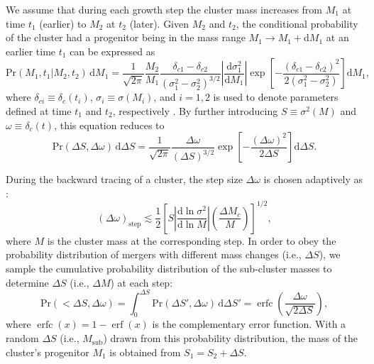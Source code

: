 \documentclass[modern]{aastex62}
\newcommand{\R}[1]{\mathrm{#1}}
\newcommand{\D}[1]{\R{d} #1}
\newcommand{\diff}[2]{\frac{\D{#1}}{\D{#2}}}
\DeclareMathOperator{\erf}{erf}
\DeclareMathOperator{\erfc}{erfc}
\begin{document}
We assume that during each growth step the cluster mass increases from
$M_1$ at time $t_1$ (earlier) to $M_2$ at $t_2$ (later).
Given $M_2$ and $t_2$, the conditional probability of the cluster had
a progenitor being in the mass range $M_1 \to M_1 + \D{M_1}$ at an
earlier time $t_1$ can be expressed as
\begin{equation}
  \label{eq:eps-condprob}
  \R{Pr}(M_1, t_1 | M_2, t_2) \,\D{M_1} = \frac{1}{\sqrt{2\pi}}
\frac{M_2}{M_1}
  \frac{\delta_{c1} - \delta_{c2}}{(\sigma_1^2 - \sigma_2^2)^{3/2}}
  \left| \diff{\sigma_1^2}{M_1} \right|
  \exp \!\left[ -\frac{(\delta_{c1} - \delta_{c2})^2}
    {2(\sigma_1^2 - \sigma_2^2)} \right] \D{M_1},
\end{equation}
where
$\delta_{ci} \equiv \delta_c(t_i)$, $\sigma_i \equiv \sigma(M_i)$, and $i =
1, 2$ is used to denote parameters defined at time $t_1$ and $t_2$,
respectively \citep{lacey1993,randall2002}.
By further introducing $S \equiv \sigma^2(M)$ and
$\omega \equiv \delta_c(t)$, this equation reduces to
\begin{equation}
  \label{eq:eps-condprob-simp}
  \R{Pr}(\Delta S, \Delta \omega) \,\D{\Delta S} = \frac{1}{\sqrt{2\pi}}
  \frac{\Delta\omega}{(\Delta S)^{3/2}}
  \exp \!\left[ -\frac{(\Delta\omega)^2}{2 \Delta S} \right] \D{\Delta S}.
\end{equation}

During the backward tracing of a cluster, the step size $\Delta\omega$
is chosen adaptively as \citep{randall2002}:
\begin{equation}
  \label{sec:dw-step}
  (\Delta\omega)_{\R{step}} \lesssim \frac{1}{2} \left[
    S \left| \diff{\ln \sigma^2}{\ln M} \right|
    \left( \frac{\Delta M_c}{M} \right) \right]^{1/2},
\end{equation}
where $M$ is the cluster mass at the corresponding step.
In order to obey the probability distribution of mergers with different
mass changes (i.e., $\Delta S$),
we sample the cumulative probability distribution of the sub-cluster masses
to determine $\Delta S$ (i.e., $\Delta M$) at each step:
\begin{equation}
  \label{sec:cdf-sub-masses}
  \R{Pr}(<\!\Delta S, \Delta\omega) =
  \int_0^{\Delta S} \R{Pr}(\Delta S', \Delta\omega) \,\D{\Delta S'} =
  \erfc \!\left( \frac{\Delta \omega}{\sqrt{2 \Delta S}} \right),
\end{equation}
where $\erfc(x) = 1 - \erf(x)$ is the complementary error function.
With a random $\Delta S$ (i.e., $M_{\R{sub}}$) drawn from this probability
distribution, the mass of the cluster's progenitor $M_1$ is obtained from
$S_1 = S_2 + \Delta S$.
\end{document}

